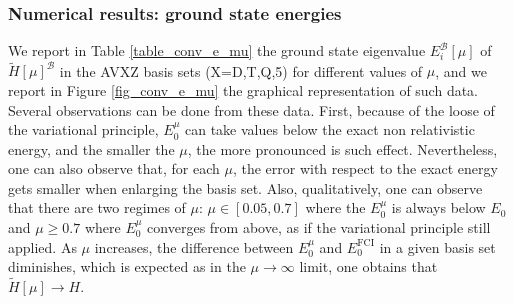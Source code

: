 \documentclass[aip,jcp,reprint,noshowkeys,superscriptaddress]{revtex4-1}
\newcommand{\basis}[0]{\mathcal{B}}
\begin{document}
\subsubsection{Numerical results: ground state energies}
\label{sec:total_e}
We report in Table \ref{table_conv_e_mu} the ground state eigenvalue $E_i^{\basis}[\mu]$ of $\tilde{H}[\mu]^{\basis}$ in the AVXZ basis sets (X=D,T,Q,5) for different values of $\mu$, and we report in Figure \ref{fig_conv_e_mu} the graphical representation of such data. 
Several observations can be done from these data. First, because of the loose of the variational principle, $E_0^{\mu}$ can take values below the exact non relativistic energy, and the smaller the $\mu$, the more pronounced is such effect. 
Nevertheless, one can also observe that, for each $\mu$, the error with respect to the exact energy gets smaller  
when enlarging the basis set. Also, qualitatively, one can observe that there are two regimes of $\mu$: $\mu \in[0.05,0.7]$ where the $E_0^\mu$ is always below $E_0$ and $\mu\ge 0.7$ where $E_0^\mu$ converges from above, as if the variational principle still applied. 
As $\mu$ increases, the difference between $E_0^\mu$ and $E_0^\text{FCI}$ in a given basis set diminishes, 
which is expected as in the $\mu \rightarrow \infty$ limit, one obtains that  $\tilde{H}[\mu] \rightarrow H$. 
\end{document}
